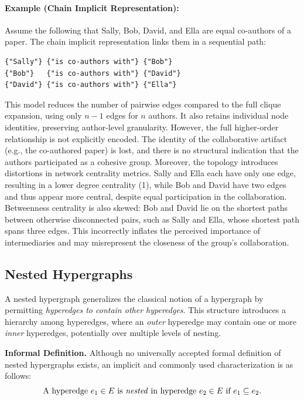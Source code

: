 \documentclass{article}
\begin{document}
\paragraph{Example (Chain Implicit Representation):} Assume the following that Sally, Bob, David, and Ella are equal co-authors of a paper. The chain implicit representation links them in a sequential path:

\begin{verbatim}
{"Sally"} {"is co-authors with"} {"Bob"}
{"Bob"}   {"is co-authors with"} {"David"}
{"David"} {"is co-authors with"} {"Ella"}
\end{verbatim}

This model reduces the number of pairwise edges compared to the full clique expansion, using only \( n - 1 \) edges for \( n \) authors. It also retains individual node identities, preserving author-level granularity. However, the full higher-order relationship is not explicitly encoded. The identity of the collaborative artifact (e.g., the co-authored paper) is lost, and there is no structural indication that the authors participated as a cohesive group. Moreover, the topology introduces distortions in network centrality metrics. Sally and Ella each have only one edge, resulting in a lower degree centrality (1), while Bob and David have two edges and thus appear more central, despite equal participation in the collaboration. Betweenness centrality is also skewed: Bob and David lie on the shortest paths between otherwise disconnected pairs, such as Sally and Ella, whose shortest path spans three edges. This incorrectly inflates the perceived importance of intermediaries and may misrepresent the closeness of the group’s collaboration.


\subsection*{Nested Hypergraphs}

A nested hypergraph generalizes the classical notion of a hypergraph by permitting \emph{hyperedges to contain other hyperedges}. This structure introduces a hierarchy among hyperedges, where an \emph{outer} hyperedge may contain one or more \emph{inner} hyperedges, potentially over multiple levels of nesting.

\textbf{Informal Definition.} Although no universally accepted formal definition of nested hypergraphs exists, an implicit and commonly used characterization is as follows:
\[
\text{A hyperedge } e_1 \in E \text{ is \emph{nested} in hyperedge } e_2 \in E \text{ if } e_1 \subseteq e_2.
\]
\end{document}
